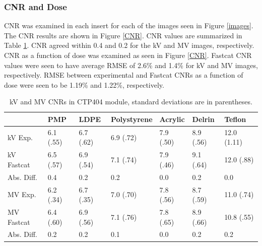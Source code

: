 \subsubsection{CNR and Dose}

CNR was examined in each insert for each of the images seen in Figure \ref{images}. The CNR results are shown in Figure \ref{CNR}. CNR values are summarized in Table \ref{tableCNR}. CNR agreed within 0.4 and 0.2 for the kV and MV images, respectively. CNR as a function of dose was examined as seen in Figure \ref{CNR}. Fastcat CNR values were seen to have average RMSE of 2.6\% and 1.4\% for kV and MV images, respectively. RMSE between experimental and Fastcat CNRs as a function of dose were seen to be 1.19\% and 1.22\%, respectively.

\begin{table}[h!]
\caption{kV and MV CNRs in CTP404 module, standard deviations are in parentheses.
}
\label{tableCNR}
\begin{center}
\begin{tabular}{|l|l|l|l|l|l|l|}
\hline
           & PMP       & LDPE      & Polystyrene & Acrylic   & Delrin    & Teflon      \\ \hline
kV Exp.    & 6.1 (.55) & 6.7 (.62) & 6.9 (.72)   & 7.9 (.50) & 8.9 (.56) & 12.0 (1.11) \\ \hline
kV Fastcat & 6.5 (.57) & 6.9 (.54) & 7.1 (.74)   & 7.9 (.46) & 9.1 (.64) & 12.0 (.88)  \\ \hline
Abs. Diff. & 0.4       & 0.2       & 0.2         & 0.0       & 0.2       & 0.0         \\ \hline
MV Exp.    & 6.2 (.34) & 6.7 (.35) & 7.0 (.70)   & 7.8 (.56) & 8.7 (.59) & 11.0 (.74)  \\ \hline
MV Fastcat & 6.4 (.60) & 6.9 (.56) & 7.1 (.76)   & 7.8 (.65) & 8.9 (.66) & 10.8 (.55)  \\ \hline
Abs. Diff. & 0.2       & 0.2       & 0.1         & 0.0       & 0.2       & 0.2         \\ \hline
\end{tabular}
\end{center}
\vspace{10mm}
\end{table}

